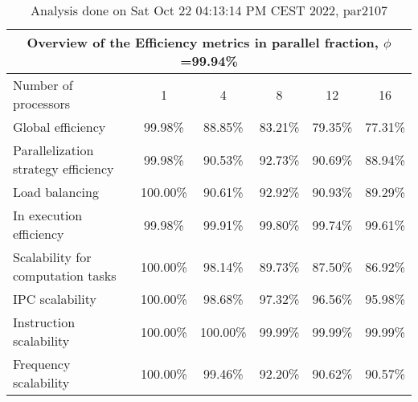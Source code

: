 \begin{table}[h]
\begin{center}
\begin{tabular}{|l|c|c|c|c|c|}
\hline
\multicolumn{6}{|c|}{Overview of the Efficiency metrics in parallel fraction, $\phi$=99.94\%} \\
\hline
\hline
Number of processors & 1 & 4 & 8 & 12 & 16 \\
\hline
\hline
Global efficiency                      &     99.98\% &     88.85\% &     83.21\% &     79.35\% &     77.31\% \\
\hline
\hline
Parallelization strategy efficiency &     99.98\% &     90.53\% &     92.73\% &     90.69\% &     88.94\% \\
\hline
Load balancing                   &    100.00\% &     90.61\% &     92.92\% &     90.93\% &     89.29\% \\
In execution efficiency          &     99.98\% &     99.91\% &     99.80\% &     99.74\% &     99.61\% \\
\hline
\hline
Scalability for computation tasks   &    100.00\% &     98.14\% &     89.73\% &     87.50\% &     86.92\% \\
\hline
IPC scalability                  &    100.00\% &     98.68\% &     97.32\% &     96.56\% &     95.98\% \\
Instruction scalability          &    100.00\% &    100.00\% &     99.99\% &     99.99\% &     99.99\% \\
Frequency scalability            &    100.00\% &     99.46\% &     92.20\% &     90.62\% &     90.57\% \\
\hline
\end{tabular}
\end{center}
\caption{ Analysis done on Sat Oct 22 04:13:14 PM CEST 2022, par2107}
\end{table}
